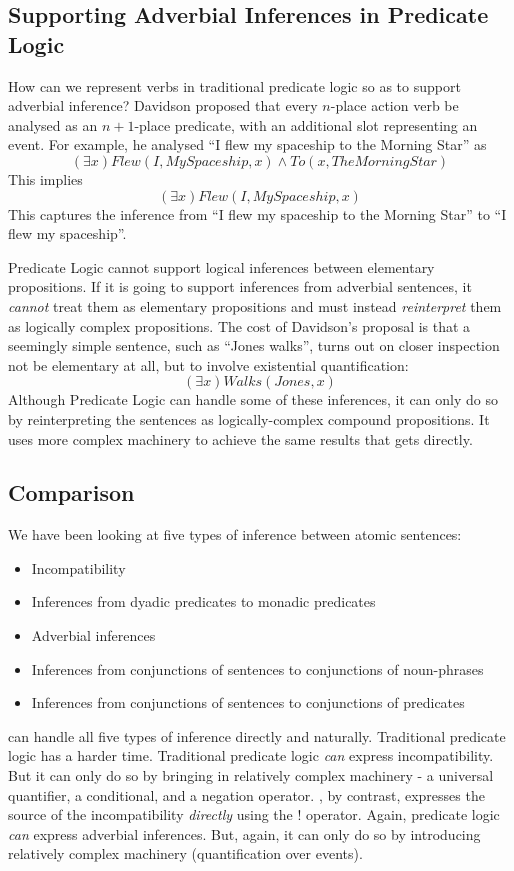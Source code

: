 \subsection{Supporting Adverbial Inferences in Predicate Logic}
How can we represent verbs in traditional predicate logic so as to support adverbial inference?
Davidson \cite{davidson2} proposed that every $n$-place action verb be analysed as an $n+1$-place predicate, with an additional slot representing an event.
For example, he  analysed ``I flew my spaceship to the Morning Star'' as 
\[
(\exists x) Flew(I, MySpaceship, x) \land To(x, TheMorningStar)
\]
This implies 
\[
(\exists x) Flew(I, MySpaceship, x)
\]
This captures the inference from ``I flew my spaceship to the Morning Star'' to ``I flew my spaceship''.

Predicate Logic cannot support logical inferences between elementary propositions. 
If it is going to support inferences from adverbial sentences, it \emph{cannot} treat them as elementary propositions and must instead \emph{reinterpret} them as logically complex propositions.
The cost of Davidson's proposal is that a seemingly simple sentence, such as ``Jones walks'', turns out on closer inspection not be elementary at all,  but to involve existential quantification:
\[
(\exists x) Walks(Jones, x)
\]
Although Predicate Logic can handle some of these inferences, it can only do so by reinterpreting the sentences as logically-complex compound propositions. 
It uses more complex machinery to achieve the same results that \ELFULL{} gets directly.

\subsection{Comparison}
We have been looking at five types of inference between atomic sentences:
\begin{itemize}
\item
Incompatibility
\item
Inferences from dyadic predicates to monadic predicates
\item
Adverbial inferences
\item
Inferences from conjunctions of sentences to conjunctions of noun-phrases
\item
Inferences from conjunctions of sentences to conjunctions of predicates
\end{itemize}
\ELFULL{} can handle all five types of inference directly and naturally.
Traditional predicate logic has a harder time.
Traditional predicate logic \emph{can} express incompatibility. But it can only do so by bringing in relatively complex machinery - a universal quantifier, a conditional, and a negation operator. \ELFULL{}, by contrast, expresses the source of the incompatibility \emph{directly} using the $!$ operator.
Again, predicate logic \emph{can} express adverbial inferences. But, again, it can only do so by introducing relatively complex machinery (quantification over events). 


